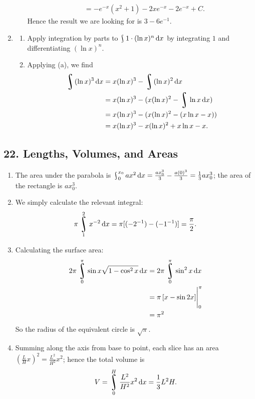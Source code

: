 \begin{enumerate}
\begin{enumerate}
\begin{align*}
                                            &= -e^{-x}(x^2 + 1) - 2xe^{-x} -2e^{-x} + C.
            \end{align*}
            Hence the result we are looking for is $ 3 - 6e^{-1} $.
    \end{enumerate}
  \item
    \begin{enumerate}
      \item Apply integration by parts to $ \rint 1 \cdot (\ln x)^n \dif{x} $ by integrating $ 1 $ and differentiating $ (\ln x)^n $.
      \item Applying (a), we find
            \begin{align*}
              \rint (\ln x)^3 \dif{x} &= x(\ln x)^3 - \rint (\ln x)^{2} \dif{x}\\
                                      &= x(\ln x)^3 - (x(\ln x)^2 - \rint \ln x \dif{x})\\
                                      &= x(\ln x)^3 - (x(\ln x)^2 - (x\ln x - x))\\
                                      &= x(\ln x)^3 - x(\ln x)^2 + x\ln x - x.
            \end{align*}
    \end{enumerate}
\end{enumerate}

\subsection*{22. Lengths, Volumes, and Areas}
\begin{enumerate}
  \item The area under the parabola is $ \rint_0^{x_0} ax^2 \dif{x} = \frac{ax_0^3}{3} - \frac{a(0)^3}{3} = \frac{1}{3}ax_0^3 $; the area of
        the rectangle is $ ax_0^3 $.
  \item We simply calculate the relevant integral:
        \begin{displaymath}
          \pi \rint_1^2 x^{-2} \dif{x} = \pi [(-2^{-1}) - (-1^{-1})] = \frac{\pi}{2}.
        \end{displaymath}
  \item Calculating the surface area:
        \begin{align*}
          2\pi \rint_0^\pi \sin x \sqrt{1 - \cos^2 x} \dif{x} &= 2\pi \rint_0^\pi \sin^2 x \dif{x}\\
                                                              &= \pi \eval{\left[ x - \sin 2x \right]}_0^\pi\\
                                                              &= \pi^2
        \end{align*}
        So the radius of the equivalent circle is $ \sqrt{\pi} $.
  \item Summing along the axis from base to point, each slice has an area $ \left(\frac{L}{H}{x}\right)^2 = \frac{L^2}{H^2}x^2 $;
        hence the total volume is
        \begin{displaymath}
          V = \rint_0^H \frac{L^2}{H^2}x^2 \dif{x} = \frac{1}{3} L^2 H.
        \end{displaymath}
\end{enumerate}

